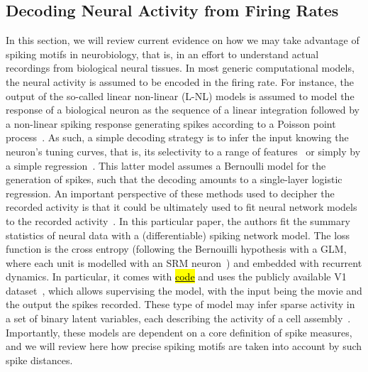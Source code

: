 \documentclass[brainsci, %
               review,accept,pdftex,moreauthors
               ]{Definitions/mdpi}
\begin{document}
\subsection{Decoding Neural Activity from Firing Rates}
In this section, we will review current evidence on how we may take advantage of spiking motifs in neurobiology, that is, in an effort to understand actual recordings from biological neural tissues. In most generic computational models, the neural activity is assumed to be encoded in the firing rate. For instance, the output of the so-called linear non-linear (L-NL) models is assumed to model the response of a biological neuron as the sequence of a linear integration followed by a non-linear spiking response generating spikes according to a Poisson point process~\citep{simoncelli_characterization_2003}. As such, a simple decoding strategy is to infer the input knowing the neuron's tuning curves, that is, its selectivity to a range of features~\citep{jazayeri_optimal_2006} or simply by a simple regression~\citep{berens_fast_2012}. This latter model assumes a Bernoulli model for the generation of spikes, such that the decoding amounts to a single-layer logistic regression. An important perspective of these methods used to decipher the recorded activity is that it could be ultimately used to fit neural network models to the recorded activity~\citep{bellec_fitting_2021}. In this particular paper, the authors fit the summary statistics of neural data with a (differentiable) spiking network model. The loss function is the cross entropy (following the Bernouilli hypothesis with a GLM, where each unit is modelled with an SRM neuron~\citep{gerstner_time_1995}) and embedded with recurrent dynamics. In particular, it comes with \href{https://github.com/EPFL-LCN/pub-bellec-wang-2021-sample-and-measure}{\hl{code}} and uses the publicly available V1 dataset~\citep{kohn_utah_2016}, which allows supervising the model, with the input being the movie and the output the spikes recorded. These type of model may infer sparse activity in a set of binary latent variables, each describing the activity of a cell assembly~\citep{warner_probabilistic_2022}.
 Importantly, these models are dependent on a core definition of spike measures, and we will review here how precise spiking motifs are taken into account by such spike distances.
%
\end{document}
